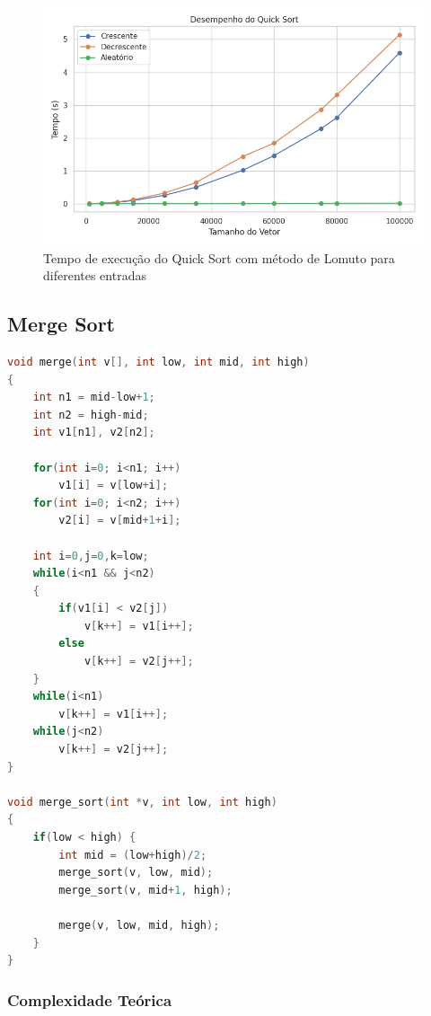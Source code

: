 \begin{figure}[H]
    \centering
    \includegraphics[width=1\textwidth]{../codigos/resultados/quick_grafico.png}
    \caption{Tempo de execução do Quick Sort com método de Lomuto para diferentes entradas}
    \label{fig:quick_lomuto-grafico}
\end{figure}

\subsection{Merge Sort}
\begin{lstlisting}[language=C, caption={Implementação do Merge Sort}, label={lst:merge}]
void merge(int v[], int low, int mid, int high)
{
    int n1 = mid-low+1;
    int n2 = high-mid;
    int v1[n1], v2[n2];

    for(int i=0; i<n1; i++)
        v1[i] = v[low+i];
    for(int i=0; i<n2; i++)
        v2[i] = v[mid+1+i];

    int i=0,j=0,k=low;
    while(i<n1 && j<n2)
    {
        if(v1[i] < v2[j])
            v[k++] = v1[i++];
        else
            v[k++] = v2[j++];
    }
    while(i<n1)
        v[k++] = v1[i++];
    while(j<n2)
        v[k++] = v2[j++];
}

void merge_sort(int *v, int low, int high)
{
    if(low < high) {
        int mid = (low+high)/2;
        merge_sort(v, low, mid);
        merge_sort(v, mid+1, high);

        merge(v, low, mid, high);
    }
}
\end{lstlisting}

\subsubsection{Complexidade Teórica}

